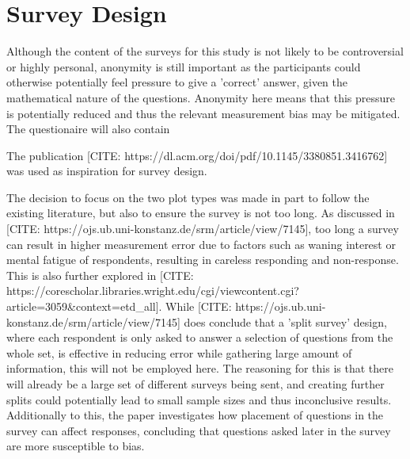 \section{Survey Design}

Although the content of the 
surveys for this study is not likely to be controversial or highly personal, anonymity is still important as the participants could otherwise 
potentially feel pressure to give a 'correct' answer, given the mathematical nature of the questions. Anonymity here means that this pressure 
is potentially reduced and thus the relevant measurement bias may be mitigated. The questionaire will also contain 


The publication [CITE: https://dl.acm.org/doi/pdf/10.1145/3380851.3416762] was used as inspiration for survey design.

The decision to focus on the two plot types was made in part to follow the existing literature, but also to ensure the survey is not too long. 
As discussed in [CITE: https://ojs.ub.uni-konstanz.de/srm/article/view/7145], too long a survey can result in higher measurement error due to factors 
such as waning interest or mental fatigue of respondents, resulting in careless responding and non-response. This is also further explored in 
[CITE: https://corescholar.libraries.wright.edu/cgi/viewcontent.cgi?article=3059&context=etd_all]. While 
[CITE: https://ojs.ub.uni-konstanz.de/srm/article/view/7145] does conclude that a 'split survey' design, where each respondent is only asked to 
answer a selection of questions from the whole set, is effective in reducing error while gathering large amount of information, this will not be employed
here. The reasoning for this is that there will already be a large set of different surveys being sent, and creating further splits could potentially lead
to small sample sizes and thus inconclusive results. Additionally to this, the paper investigates how placement of questions in the survey can affect
responses, concluding that questions asked later in the survey are more susceptible to bias. 


% 


